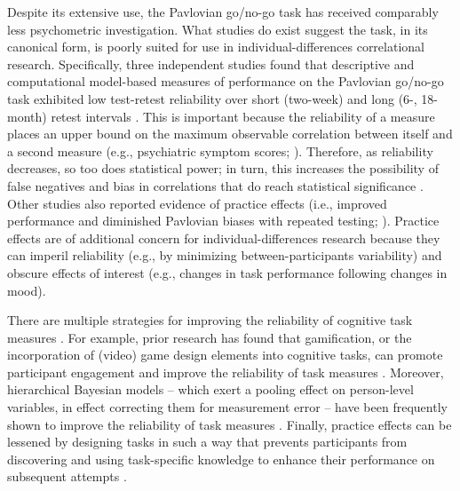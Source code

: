 \documentclass[a4paper,12pt]{article}
\begin{document}
\begin{refsection}[main]
Despite its extensive use, the Pavlovian go/no-go task has received comparably less psychometric investigation. What studies do exist suggest the task, in its canonical form, is poorly suited for use in individual-differences correlational research. Specifically, three independent studies found that descriptive and computational model-based measures of performance on the Pavlovian go/no-go task exhibited low test-retest reliability over short (two-week) and long (6-, 18-month) retest intervals \cite{moutoussis2018change, pike2022test, saeedpour2023interindividual}. This is important because the reliability of a measure places an upper bound on the maximum observable correlation between itself and a second measure (e.g., psychiatric symptom scores; \cite{Spearman1904-mo}). Therefore, as reliability decreases, so too does statistical power; in turn, this increases the possibility of false negatives \cite{Parsons2019-jw} and bias in correlations that do reach statistical significance \cite{gelman2014beyond}. Other studies also reported evidence of practice effects (i.e., improved performance and diminished Pavlovian biases with repeated testing; \cite{moutoussis2018change, saeedpour2023interindividual, schurr2024dynamic}). Practice effects are of additional concern for individual-differences research because they can imperil reliability (e.g., by minimizing between-participants variability) and obscure effects of interest (e.g., changes in task performance following changes in mood).

There are multiple strategies for improving the reliability of cognitive task measures \cite{zorowitz2023improving}. For example, prior research has found that gamification, or the incorporation of (video) game design elements into cognitive tasks, can promote participant engagement \cite{sailer2017gamification} and improve the reliability of task measures \cite{kucina2022solution, verdejo2021unified}. Moreover, hierarchical Bayesian models -- which exert a pooling effect on person-level variables, in effect correcting them for measurement error \cite{haines2023classical, rouder2019psychometrics} -- have been frequently shown to improve the reliability of task measures \cite{sullivan2022enhancing, brown2020improving, waltmann2022sufficient}. Finally, practice effects can be lessened by designing tasks in such a way that prevents participants from discovering and using task-specific knowledge to enhance their performance on subsequent attempts \cite{mclean2018towards}. 


\end{refsection}
\end{document}
